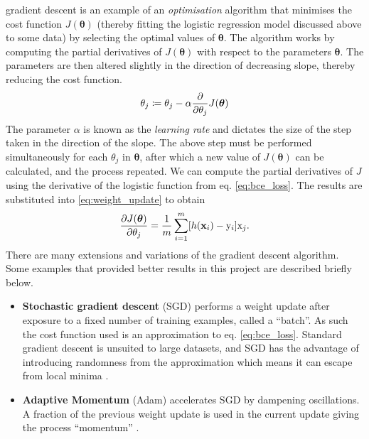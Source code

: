 gradient descent is an example of an \textit{optimisation} algorithm that minimises the cost function $J(\bm\theta)$ (thereby fitting the logistic regression model discussed above to some data) by selecting the optimal values of $\bm\theta$. The algorithm works by computing the partial derivatives of $J(\bm{\theta})$ with respect to the parameters $\bm{\theta}$. The parameters are then altered slightly in the direction of decreasing slope, thereby reducing the cost function.
%
\begin{equation}\label{eq:weight_update}
    \theta_j \coloneqq \theta_j - \alpha \frac{\partial {}}{\partial \theta_j} J(\bm\theta)
\end{equation}
%
The parameter $\alpha$ is known as the \textit{learning rate} and dictates the size of the step taken in the direction of the slope. The above step must be performed simultaneously for each $\theta_j$ in $\bm{\theta}$, after which a new value of $J(\bm{\theta})$ can be calculated, and the process repeated. We can compute the partial derivatives of $J$ using the derivative of the logistic function from eq. \ref{eq:bce_loss}. The results are substituted into \cref{eq:weight_update} to obtain
%
\begin{equation}\label{cfpd}
    \frac{\partial {J(\bm\theta)}}{\partial \theta_j} = \frac{1}{m} \sum_{i=1}^m [h(\mathbf{x}_i) - \mathrm{y}_i] \mathrm{x}_j .
\end{equation}
%
There are many extensions and variations of the gradient descent algorithm. Some examples that provided better results in this project are described briefly below.
%
\begin{itemize}
    \item \textbf{Stochastic gradient descent} (SGD) performs a weight update after exposure to a fixed number of training examples, called a ``batch''. As such the cost function used is an approximation to eq. \cref{eq:bce_loss}. Standard gradient descent is unsuited to large datasets, and SGD has the advantage of introducing randomness from the approximation which means it can escape from local minima \cite{stochasticgrad}.
    \item \textbf{Adaptive Momentum} (Adam) accelerates SGD by dampening oscillations. A fraction of the previous weight update is used in the current update giving the process ``momentum'' \cite{2014arXiv1412.6980K}.
\end{itemize}





